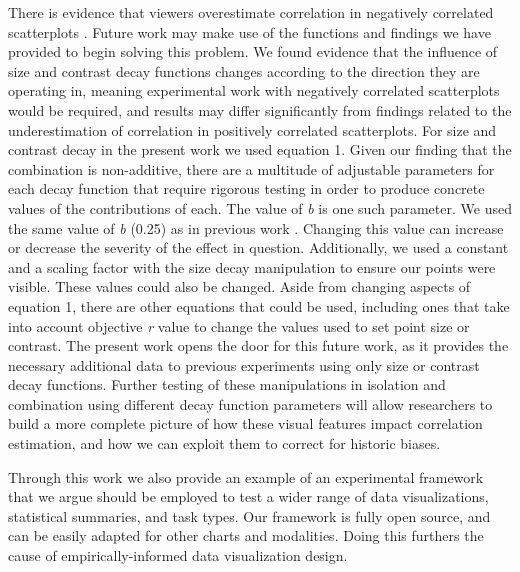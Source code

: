 \documentclass[manuscript, review, anonymous, screen]{acmart}
\begin{document}
There is evidence that viewers overestimate correlation in negatively
correlated scatterplots \citep{sher_2017}. Future work may make use of
the functions and findings we have provided to begin solving this
problem. We found evidence that the influence of size and contrast decay
functions changes according to the direction they are operating in,
meaning experimental work with negatively correlated scatterplots would
be required, and results may differ significantly from findings related
to the underestimation of correlation in positively correlated
scatterplots. For size and contrast decay in the present work we used
equation 1. Given our finding that the combination is non-additive,
there are a multitude of adjustable parameters for each decay function
that require rigorous testing in order to produce concrete values of the
contributions of each. The value of \emph{b} is one such parameter. We
used the same value of \emph{b} (0.25) as in previous work
\citep{strain_2023, strain_2023b}. Changing this value can increase or
decrease the severity of the effect in question. Additionally, we used a
constant and a scaling factor with the size decay manipulation to ensure
our points were visible. These values could also be changed. Aside from
changing aspects of equation 1, there are other equations that could be
used, including ones that take into account objective \emph{r} value to
change the values used to set point size or contrast. The present work
opens the door for this future work, as it provides the necessary
additional data to previous experiments using only size
\citep{strain_2023b} or contrast \citep{strain_2023} decay functions.
Further testing of these manipulations in isolation and combination
using different decay function parameters will allow researchers to
build a more complete picture of how these visual features impact
correlation estimation, and how we can exploit them to correct for
historic biases.

Through this work we also provide an example of an experimental
framework that we argue should be employed to test a wider range of data
visualizations, statistical summaries, and task types. Our framework is
fully open source, and can be easily adapted for other charts and
modalities. Doing this furthers the cause of empirically-informed data
visualization design.




\end{document}
